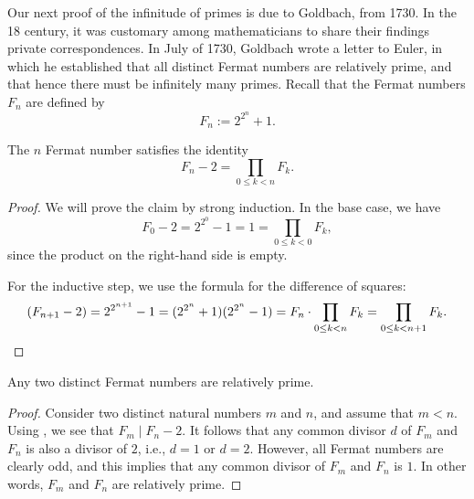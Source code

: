 Our next proof of the infinitude of primes is due to Goldbach, from 1730. In the 18\supth{} century, it was customary among mathematicians to share their findings private correspondences. In July of 1730, Goldbach wrote a letter to Euler, in which he established that all distinct Fermat numbers are relatively prime, and that hence there must be infinitely many primes. Recall that the Fermat numbers $F_n$ are defined by
\begin{equation*}
  F_n := 2^{2^n}+1.
\end{equation*}

\begin{theorem}\label{theorem:product-formula-fermat-numbers}
  The $n$\supth{} Fermat number satisfies the identity
  \begin{equation*}
    F_n - 2 = \prod_{0\leq k<n}F_k.
  \end{equation*}
\end{theorem}

\begin{proof}
  We will prove the claim by strong induction. In the base case, we have
  \begin{equation*}
    F_0-2 = 2^{2^0}-1=1=\prod_{0\leq k<0}F_k,
  \end{equation*}
  since the product on the right-hand side is empty.

  For the inductive step, we use the formula for the difference of squares:
  \begin{equation*}
    (F_{n+1}-2)=2^{2^{n+1}}-1=(2^{2^n}+1)(2^{2^n}-1)=F_n \cdot \prod_{0\leq k<n}F_k= \prod_{0\leq k<n+1}F_k.\qedhere
  \end{equation*}
\end{proof}

\begin{theorem}\label{theorem:goldbachs-theorem}
  Any two distinct Fermat numbers are relatively prime.
\end{theorem}

\begin{proof}
  Consider two distinct natural numbers $m$ and $n$, and assume that $m<n$. Using , we see that $F_m \mid F_n - 2$. It follows that any common divisor $d$ of $F_m$ and $F_n$ is also a divisor of $2$, i.e., $d=1$ or $d=2$. However, all Fermat numbers are clearly odd, and this implies that any common divisor of $F_m$ and $F_n$ is $1$. In other words, $F_m$ and $F_n$ are relatively prime.
\end{proof}

